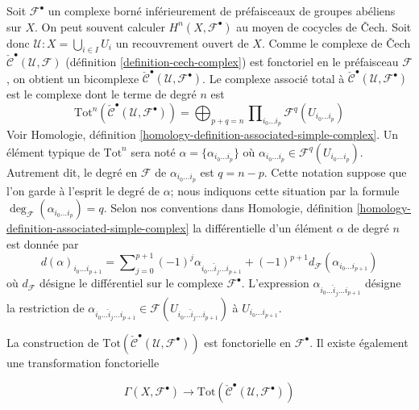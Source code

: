 \medskip\noindent

Soit ${\mathcal F}^\bullet$ un complexe borné inférieurement de préfaisceaux de groupes abéliens sur $X$. On peut souvent calculer $H^n(X, {\mathcal F}^\bullet)$
au moyen de cocycles de {\v C}ech. Soit donc
${\mathcal U} : X = \bigcup_{i \in I} U_i$
un recouvrement ouvert de $X$. Comme le complexe de {\v C}ech
$\check{\mathcal{C}}^\bullet(\mathcal{U}, \mathcal{F})$
(définition \ref{definition-cech-complex}) est fonctoriel en le préfaisceau $\mathcal{F}$, on obtient un bicomplexe
$\check{\mathcal{C}}^\bullet(\mathcal{U}, \mathcal{F}^\bullet)$. Le complexe associé total à
$\check{\mathcal{C}}^\bullet({\mathcal U}, {\mathcal F}^\bullet)$
est le complexe dont le terme de degré $n$ est
$$
\text{Tot}^n(\check{\mathcal{C}}^\bullet({\mathcal U}, {\mathcal F}^\bullet))
=
\bigoplus\nolimits_{p + q = n}
\prod\nolimits_{i_0\ldots i_p} {\mathcal F}^q(U_{i_0\ldots i_p})
$$
Voir Homologie, définition \ref{homology-definition-associated-simple-complex}. Un élément typique de $\text{Tot}^n$ sera noté
$\alpha = \{\alpha_{i_0\ldots i_p}\}$ où
$\alpha_{i_0 \ldots i_p} \in \mathcal{F}^q(U_{i_0\ldots i_p})$. Autrement dit, le degré en $\mathcal{F}$ de $\alpha_{i_0\ldots i_p}$ est
$q = n - p$. Cette notation suppose que l'on garde à l'esprit le degré de $\alpha$;
nous indiquons cette situation par la formule
$\deg_{\mathcal F}(\alpha_{i_0\ldots i_p}) = q$. Selon nos conventions dans Homologie, définition \ref{homology-definition-associated-simple-complex}
la différentielle d'un élément $\alpha$ de degré $n$ est donnée par
$$
d(\alpha)_{i_0\ldots i_{p + 1}}
=
\sum\nolimits_{j = 0}^{p + 1}
(-1)^j \alpha_{i_0 \ldots \hat i_j \ldots i_{p + 1}} + 
(-1)^{p + 1}d_{{\mathcal F}}(\alpha_{i_0 \ldots i_{p + 1}})
$$
où $d_\mathcal{F}$ désigne le différentiel sur le complexe
$\mathcal{F}^\bullet$. L'expression $\alpha_{i_0 \ldots \hat i_j \ldots i_{p + 1}}$ désigne la restriction de $\alpha_{i_0 \ldots \hat i_j \ldots i_{p + 1}}
\in {\mathcal F}(U_{i_0\ldots\hat i_j\ldots i_{p + 1}})$ à
$U_{i_0 \ldots i_{p + 1}}$.

\medskip\noindent

La construction de
$\text{Tot}(\check{\mathcal{C}}^\bullet({\mathcal U}, {\mathcal F}^\bullet))$
est fonctorielle en ${\mathcal F}^\bullet$. Il existe également une transformation fonctorielle

\begin{equation}
\label{equation-global-sections-to-cech}
\Gamma(X, {\mathcal F}^\bullet)
\longrightarrow
\text{Tot}(\check{\mathcal{C}}^\bullet({\mathcal U}, {\mathcal F}^\bullet))
\end{equation}

